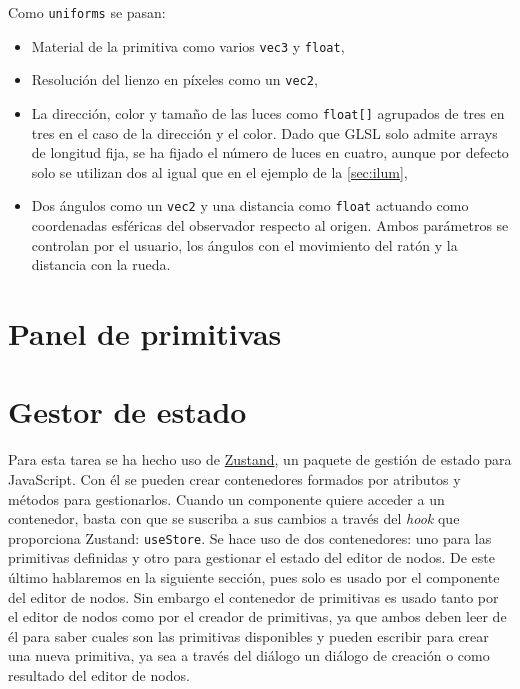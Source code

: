 Como \texttt{uniforms} se pasan: 
\begin{itemize}
    \item Material de la primitiva como varios \texttt{vec3} y \texttt{float}, 
    \item Resolución del lienzo en píxeles como un \texttt{vec2},
    \item La dirección, color y tamaño de las luces como \texttt{float[]} agrupados de tres en tres en el caso de la dirección y el color. Dado que GLSL solo admite arrays de longitud fija, se ha fijado el número de luces en cuatro, aunque por defecto solo se utilizan dos al igual que en el ejemplo de la \autoref{sec:ilum},
    \item Dos ángulos como un \texttt{vec2} y una distancia como \texttt{float} actuando como coordenadas esféricas del observador respecto al origen. Ambos parámetros se controlan por el usuario, los ángulos con el movimiento del ratón y la distancia con la rueda.
\end{itemize}

\section{Panel de primitivas}

\section{Gestor de estado}
Para esta tarea se ha hecho uso de \href{https://github.com/pmndrs/zustand}{Zustand}, un paquete de gestión de estado para JavaScript. Con él se pueden crear contenedores formados por atributos y métodos para gestionarlos. Cuando un componente quiere acceder a un contenedor, basta con que se suscriba a sus cambios a través del \textit{hook} que proporciona Zustand: \texttt{useStore}. Se hace uso de dos contenedores: uno para las primitivas definidas y otro para gestionar el estado del editor de nodos. De este último hablaremos en la siguiente sección, pues solo es usado por el componente del editor de nodos. Sin embargo el contenedor de primitivas es usado tanto por el editor de nodos como por el creador de primitivas, ya que ambos deben leer de él para saber cuales son las primitivas disponibles y pueden escribir para crear una nueva primitiva, ya sea a través del diálogo un diálogo de creación o como resultado del editor de nodos. 

